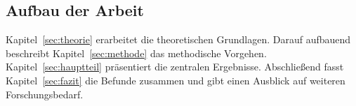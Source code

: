 \subsection{Aufbau der Arbeit}
\label{sec:aufbau}

Kapitel~\ref{sec:theorie} erarbeitet die theoretischen Grundlagen. Darauf aufbauend
beschreibt Kapitel~\ref{sec:methode} das methodische Vorgehen. Kapitel~\ref{sec:hauptteil}
präsentiert die zentralen Ergebnisse. Abschließend fasst Kapitel~\ref{sec:fazit}
die Befunde zusammen und gibt einen Ausblick auf weiteren Forschungsbedarf.

\clearpage
